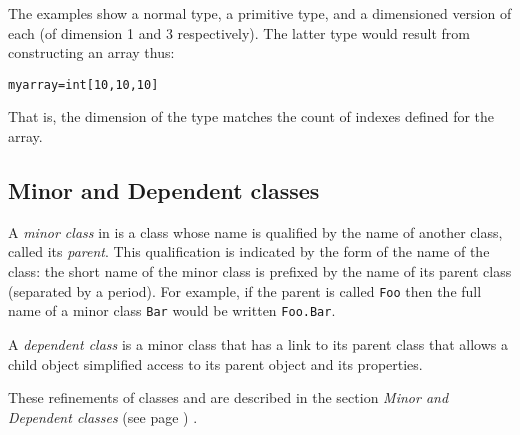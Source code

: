 The examples show a normal type, a primitive type, and a dimensioned
version of each (of dimension 1 and 3 respectively).  The latter type
would result from constructing an array thus:
\begin{alltt}
myarray=int[10,10,10]
\end{alltt}
That is, the dimension of the type matches the count of indexes
defined for the array.
\subsection{Minor and Dependent classes}\label{refmindep}
 
A \emph{minor class} in \nr{} is a class whose name is qualified by
the name of another class, called its \emph{parent}.
This qualification is indicated by the form of the name of the class:
the short name of the minor class is prefixed by the name of its parent
class (separated by a period).
For example, if the parent is called \texttt{Foo} then the full name of a
minor class \texttt{Bar} would be written \texttt{Foo.Bar}.
 
A \emph{dependent class} is a minor class that has a link to its
parent class that allows a child object simplified access to its
parent object and its properties.
 
These refinements of classes and are described in the
section  \emph{Minor and Dependent classes} (see page \pageref{refminor}) .
